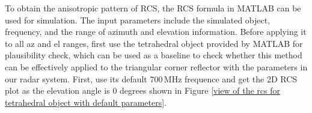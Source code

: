 \documentclass[12pt,DIV14,BCOR12mm,a4paper,footinclude=false,headinclude,parskip=half-,twoside,openright,cleardoublepage=empty,toc=index,bibliography=totoc,listof=totoc]{scrreprt}
\numberwithin{equation}{chapter}
\begin{document}
To obtain the anisotropic pattern of RCS, the RCS formula in MATLAB can be used for simulation. The input parameters include the simulated object, frequency, and the range of azimuth and elevation information. Before applying it to all az and el ranges, first use the tetrahedral object provided by MATLAB \cite{rcs_plausibility} for plausibility check, which can be used as a baseline to check whether this method can be effectively applied to the triangular corner reflector with the parameters in our radar system. First, use its default $700\,\mathrm{MHz}$ frequence and get the 2D RCS plot as the elevation angle is 0 degrees shown in Figure \ref{view of the rcs for tetrahedral object with default parameters}.

\begin{figure}[t]
    \centering
    \begin{subfigure}{0.45\textwidth}
        \centering
    \end{subfigure}
    \begin{subfigure}{0.45\textwidth}
        \centering

\end{subfigure}
\end{figure}
\end{document}
